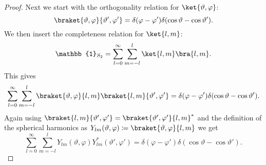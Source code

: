 \documentclass[fleqn]{NotesClass}
\newcommand*{\ident}{\mathbb{1}}
\begin{document}
\begin{lma}{}{}
\begin{proof}
            Next we start with the orthogonality relation for \(\ket{\vartheta, \varphi}\):
            \begin{equation}
                \braket{\vartheta, \varphi}{\vartheta', \varphi'} = \delta(\varphi - \varphi')\delta(\cos\vartheta - \cos\vartheta').
            \end{equation}
            We then insert the completeness relation for \(\ket{l, m}\):
            \begin{equation}
                \ident_{S_2} = \sum_{l = 0}^{\infty} \sum_{m = -l}^l \ket{l, m}\bra{l, m}.
            \end{equation}
            This gives
            \begin{equation}
                \sum_{l = 0}^{\infty} \sum_{m = -l}^{l} \braket{\vartheta, \varphi}{l, m}\braket{l, m}{\vartheta', \varphi'} = \delta(\varphi - \varphi')\delta(\cos\vartheta - \cos\vartheta').
            \end{equation}
            Again using \(\braket{l, m}{\vartheta', \varphi'} = \braket{\vartheta', \varphi'}{l, m}^*\) and the definition of the spherical harmonics as \(Y_{lm}(\vartheta, \varphi) \coloneqq \braket{\vartheta, \varphi}{l, m}\) we get
            \begin{equation}
                \sum_{l = 0}^{\infty} \sum_{m = -l}^{l} Y_{lm}(\vartheta, \varphi) Y_{lm}^*(\vartheta', \varphi') = \delta(\varphi - \varphi')\delta(\cos\vartheta - \cos\vartheta').
            \end{equation}
        \end{proof}
    \end{lma}
    
\end{document}
